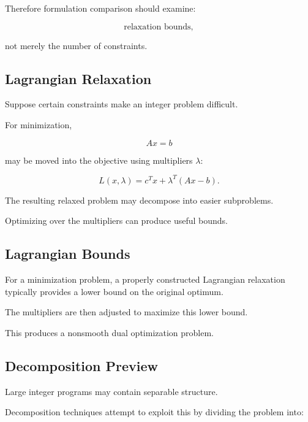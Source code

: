 Therefore formulation comparison should examine:

\[
\boxed{
\text{relaxation bounds},
}
\]

not merely the number of constraints.

\subsection{Lagrangian Relaxation}
\label{subsec:lagrangian-relaxation-integer}

Suppose certain constraints make an integer problem difficult.

For minimization,

\[
Ax=b
\]

may be moved into the objective using multipliers \(\lambda\):

\[
\boxed{
L(x,\lambda)
=
c^Tx
+
\lambda^T(Ax-b).
}
\]

The resulting relaxed problem may decompose into easier subproblems.

Optimizing over the multipliers can produce useful bounds.

\subsection{Lagrangian Bounds}
\label{subsec:lagrangian-bounds-integer}

For a minimization problem, a properly constructed Lagrangian relaxation
typically provides a lower bound on the original optimum.

The multipliers are then adjusted to maximize this lower bound.

This produces a nonsmooth dual optimization problem.

\subsection{Decomposition Preview}
\label{subsec:integer-decomposition-preview}

Large integer programs may contain separable structure.

Decomposition techniques attempt to exploit this by dividing the problem
into:

